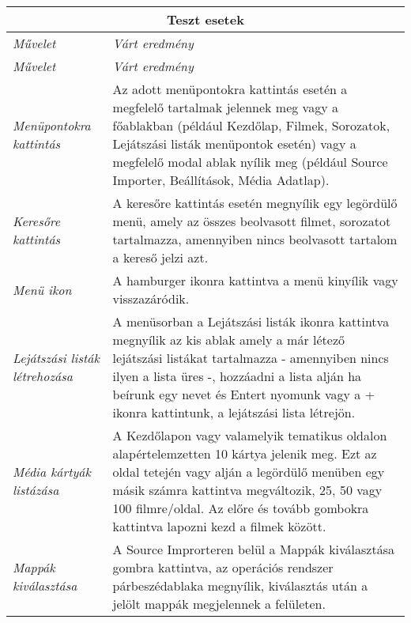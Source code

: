 \begin{center}
	\begin{longtable}{ | p{} | p{} | }

		\hline
		\multicolumn{2}{|c|}{\textbf{Teszt esetek}}
		\\ \hline

		\emph{Művelet} & \emph{Várt eredmény}
		\\ \hline \hline
		\endfirsthead %

		\hline
		\emph{Művelet} & \emph{Várt eredmény}
		\\ \hline \hline
		\endhead %

		\hline
		\endfoot %

		\endlastfoot %

		\emph{Menüpontokra kattintás}
		& Az adott menüpontokra kattintás esetén a megfelelő tartalmak jelennek meg vagy a főablakban (például Kezdőlap, Filmek, Sorozatok, Lejátszási listák menüpontok esetén) vagy a megfelelő modal ablak nyílik meg (például Source Importer, Beállítások, Média Adatlap).
		\\ \hline

		\emph{Keresőre kattintás}
		& A keresőre kattintás esetén megnyílik egy legördülő menü, amely az összes beolvasott filmet, sorozatot tartalmazza, amennyiben nincs beolvasott tartalom a kereső jelzi azt.
		\\ \hline

        \emph{Menü ikon}
		& A hamburger ikonra kattintva a menü kinyílik vagy visszazáródik.
		\\ \hline

        \emph{Lejátszási listák létrehozása}
		& A menüsorban a Lejátszási listák ikonra kattintva megnyílik az kis ablak amely a már létező lejátszási listákat tartalmazza - amennyiben nincs ilyen a lista üres -, hozzáadni a lista alján ha beírunk egy nevet és Entert nyomunk vagy a + ikonra kattintunk, a lejátszási lista létrejön.
		\\ \hline

        \emph{Média kártyák listázása}
		& A Kezdőlapon vagy valamelyik tematikus oldalon alapértelemzetten 10 kártya jelenik meg. Ezt az oldal tetején vagy alján a legördülő menüben egy másik számra kattintva megváltozik, 25, 50 vagy 100 filmre/oldal. Az előre és tovább gombokra kattintva lapozni kezd a filmek között.
		\\ \hline

		\emph{Mappák kiválasztása}
		& A Source Improrteren belül a Mappák kiválasztása gombra kattintva, az operációs rendszer párbeszédablaka megnyílik, kiválasztás után a jelölt mappák megjelennek a felületen.
		\\ \hline


\end{longtable}
\end{center}
